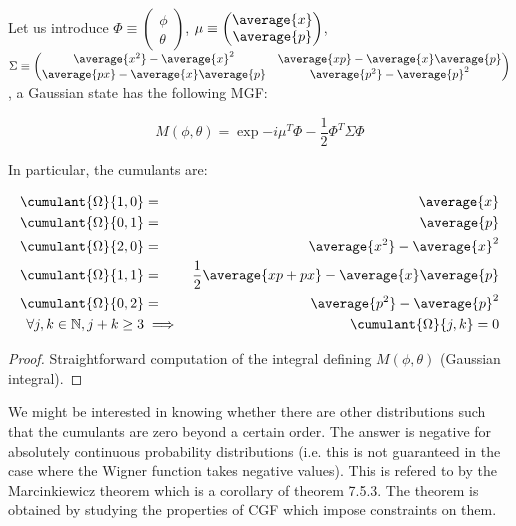 \begin{theorem}
    Let us introduce $\Phi \equiv \begin{pmatrix}
        \phi\\
        \theta
    \end{pmatrix}$, $\mu \equiv \begin{pmatrix}
        \average{x}\\
        \average{p}
    \end{pmatrix}$, $\Sigma \equiv \begin{pmatrix}
        \average{x^2} - \average{x}^2 & \average{x p} - \average{x} \average{p}\\
        \average{p x} - \average{x} \average{p} & \average{p^2} - \average{p}^2
    \end{pmatrix}$, a Gaussian state has the following MGF:

    \begin{equation}
        M(\phi, \theta) = \exp{-i \mu^T \Phi - \frac{1}{2} \Phi^T \Sigma \Phi}
    \end{equation}

    In particular, the cumulants are:

    \begin{eqnarray}
        \cumulant{\Omega}{{1, 0}} &=& \average{x}\\
        \cumulant{\Omega}{{0, 1}} &=& \average{p}\\
        \cumulant{\Omega}{{2, 0}} &=& \average{x^2} - \average{x}^2\\
        \cumulant{\Omega}{{1, 1}} &=& \frac{1}{2} \average{x p + p x} - \average{x} \average{p}\\
        \cumulant{\Omega}{{0, 2}} &=& \average{p^2} - \average{p}^2\\
        \forall j, k \in \mathbb{N}, j + k \ge 3 &\implies& \cumulant{\Omega}{{j, k}} = 0
    \end{eqnarray}
\end{theorem}

\begin{proof}
    Straightforward computation of the integral defining $ M(\phi, \theta)$ (Gaussian integral).
\end{proof}

We might be interested in knowing whether there are other distributions such that the cumulants are zero beyond a certain order. The answer is negative for absolutely continuous probability distributions (i.e. this is not guaranteed in the case where the Wigner function takes negative values). This is refered to by the Marcinkiewicz theorem \cite{Book-Lukacs} which is a corollary of theorem 7.5.3. The theorem is obtained by studying the properties of CGF which impose constraints on them.

